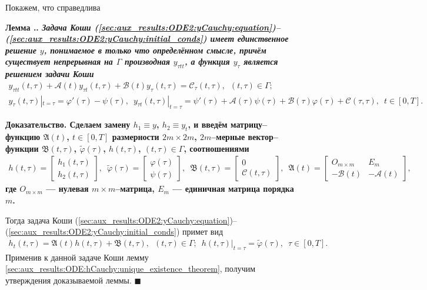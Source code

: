 \documentclass{report}
\newcounter{rem}[section]
\newcounter{lem}[section]
\renewcommand{\thelem}{\thesection.\arabic{lem}}
\newenvironment{Lemma}{\par\refstepcounter{lem}\bf Лемма \thelem. \it}{\rm\par}
\newcounter{theor}[section]
\newenvironment{Proof}{\par\noindent\bf Доказательство.\rm}{ $\blacksquare$\par}
\begin{document}
Покажем, что справедлива
\begin{Lemma}\label{sec:aux_results:ODE2:yCauchy:unique_existence}
Задача Коши (\ref{sec:aux_results:ODE2:yCauchy:equation})--(\ref{sec:aux_results:ODE2:yCauchy:initial_conds}) имеет единственное решение $y$, понимаемое в только что определённом смысле,
причём существует непрерывная на  $\Gamma$ производная $y_{\tau tt}$, а функция $y_{\tau}$ является решением задачи Коши
\begin{gather}
\label{sec:aux_results:ODE2:y_tau_Cauchy:equation}
y_{\tau tt}(t,\tau)+\mathcal{A}(t)y_{\tau t}(t,\tau)+\mathcal{B}(t)y_\tau(t,\tau)=\mathcal{C}_\tau(t,\tau),\,\,\, (t,\tau)\in\Gamma;\\
\label{sec:aux_results:ODE2:y_tau_Cauchy:initial_conds} y_\tau(t,\tau)|_{t=\tau}=\varphi'(\tau)-\psi(\tau),\,\,\,
y_{\tau t}(t,\tau)|_{t=\tau}=\psi'(\tau)+\mathcal{A}(\tau)\psi(\tau)+\mathcal{B}(\tau)\varphi(\tau)+\mathcal{C}(\tau,\tau),\,\,\,t\in[0,T].
\end{gather}
\end{Lemma}
\begin{Proof}
Сделаем замену $h_1\equiv y$, $h_2\equiv y_t$, и введём матрицу--функцию $\mathfrak{A}(t)$, $t\in[0,T]$ размерности $2m\times2m$, $2m$--мерные вектор--функции $\mathfrak{B}(t,\tau)$,
$\tilde{\varphi}(\tau)$, $h(t,\tau)$, $(t,\tau)\in\Gamma$, соотношениями
\begin{gather*}
h(t,\tau)=\left[\begin{array}{l}
            h_1(t,\tau)\\
            h_2(t,\tau)
                \end{array}\right],\,\,\,
\tilde{\varphi}(\tau)=\left[\begin{array}{l}
            \varphi(\tau)\\
            \psi(\tau)
                \end{array}\right],\,\,\,
\mathfrak{B}(t,\tau)=\left[\begin{array}{l}
            0\\
            \mathcal{C}(t,\tau)
                \end{array}\right],\,\,\,
\mathfrak{A}(t)=\left[\begin{array}{l|l}
            O_{m\times m}  & E_m\\ \hline
            -\mathcal{B}(t)&-\mathcal{A}(t)
                \end{array}\right],
\end{gather*}
где $O_{m\times m}$ --- нулевая $m\times m$--матрица, $E_m$ --- единичная матрица порядка $m$.

Тогда задача Коши (\ref{sec:aux_results:ODE2:yCauchy:equation})--(\ref{sec:aux_results:ODE2:yCauchy:initial_conds}) примет вид
\begin{gather*}
h_t(t,\tau)=\mathfrak{A}(t)h(t,\tau)+\mathfrak{B}(t,\tau),\,\,\,(t,\tau)\in\Gamma;\,\,\, h(t,\tau)|_{t=\tau}=\tilde{\varphi}(\tau),\,\,\,
\tau\in[0,T].
\end{gather*}
Применив к данной задаче Коши лемму \ref{sec:aux_results:ODE:hCauchy:unique_existence_theorem}, получим утверждения доказываемой леммы.
\end{Proof}
\end{document}
